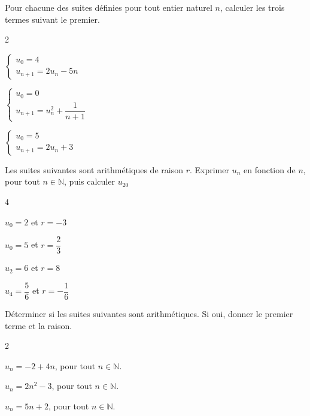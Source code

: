 \documentclass[12pt,a4paper]{article}  %
\begin{document}
Pour chacune des suites définies pour tout entier naturel $n$, calculer les trois termes suivant le premier.
\begin{multicols}{2}
	\begin{enumMet}
		\item $\left\{\begin{array}{l}u_0=4 \\ u_{n+1}=2 u_n-5 n\end{array}\right.$
		\item $\left\{\begin{array}{l}u_0=0 \\ u_{n+1}=u_n^2+\dfrac{1}{ n+1}\end{array}\right.$
		\item {} $\left\{\begin{array}{l}u_0=5 \\ u_{n+1}=2 u_{n}+3\end{array}\right.$
	\end{enumMet}
\end{multicols}


Les suites suivantes sont arithmétiques de raison $r$. Exprimer $u_n$ en fonction de $n$, pour tout $n \in \mathbb{N}$, puis calculer $u_{20}$
\begin{multicols}{4}
	\begin{enumMet}
		\item $u_0=2$ et $r=-3$
		\item $u_0=5$ et $r=\dfrac{2}{3}$
		\item {} $u_2=6$ et $r=8$
		\item $u_4=\dfrac{5}{6}$ et $r=-\dfrac{1}{6}$
	\end{enumMet}
\end{multicols}


Déterminer si les suites suivantes sont arithmétiques. Si oui, donner le premier terme et la raison.
\begin{multicols}{2}
	\begin{enumMet}
		\item $u_n=-2+4n$, pour tout $n \in \mathbb{N}$.
		\item $u_n=2n^2-3$, pour tout $n \in \mathbb{N}$.
		\item $u_n=5n+2$, pour tout $n \in \mathbb{N}$.
	\end{enumMet}
\end{multicols}
\end{document}
